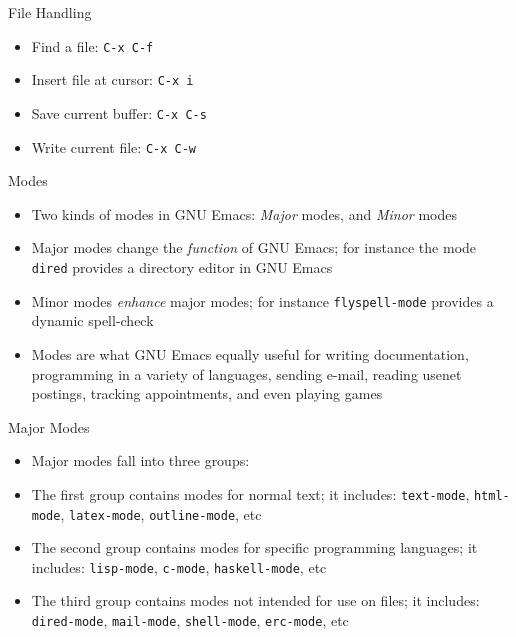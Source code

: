 \documentclass[12pt,a4paper,oneside]{beamer}
\begin{document}
\begin{frame}{File Handling}
\begin{itemize}
  \item Find a file: \texttt{C-x C-f}\newline
  \item Insert file at cursor: \texttt{C-x i}\newline
  \item Save current buffer: \texttt{C-x C-s}\newline
  \item Write current file: \texttt{C-x C-w}
\end{itemize}
\end{frame}

\begin{frame}{Modes}
\begin{itemize}
  \item Two kinds of modes in GNU Emacs: \emph{Major} modes, and \emph{Minor} modes\newline
  \item Major modes change the \emph{function} of GNU Emacs; for instance the mode \texttt{dired} provides a directory editor in GNU Emacs\newline
  \item Minor modes \emph{enhance} major modes; for instance \texttt{flyspell-mode} provides a dynamic spell-check\newline
  \item Modes are what GNU Emacs equally useful for writing documentation, programming in a variety of languages, sending e-mail, reading usenet postings, tracking appointments, and even playing games\newline
\end{itemize}
\end{frame}

\begin{frame}{Major Modes}
\begin{itemize}
  \item Major modes fall into three groups:\newline
  \item The first group contains modes for normal text; it includes: \texttt{text-mode}, \texttt{html-mode}, \texttt{latex-mode}, \texttt{outline-mode}, etc\ \newline
  \item The second group contains modes for specific programming languages; it includes: \texttt{lisp-mode}, \texttt{c-mode}, \texttt{haskell-mode}, etc\ \newline
  \item The third group contains modes not intended for use on files; it includes: \texttt{dired-mode}, \texttt{mail-mode}, \texttt{shell-mode}, \texttt{erc-mode}, etc\
\end{itemize}
\end{frame}
\end{document}
